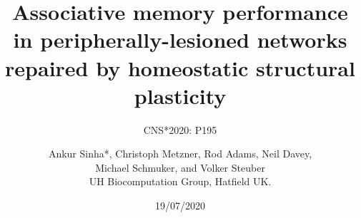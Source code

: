 
\usepackage{color}
\usepackage{tipa}
\usepackage[scale=2]{ccicons}
\usepackage{amssymb}
\usepackage{tikz}
\usetikzlibrary{mindmap, arrows.meta, positioning, arrows}
\usepackage{pgfplots}
\usepackage{jneurosci}
\usepackage{subcaption}
\usepackage[T1]{fontenc}
\usepackage[utf8]{inputenc}
\usepackage[style=nature,backend=biber,autocite=footnote]{biblatex}

\renewcommand*{\bibfont}{\tiny}
\usepackage[sfdefault]{roboto}
\usepackage[normalem]{ulem}
\usepackage{hyperref}
\hypersetup{colorlinks,linkcolor=Green,urlcolor=links}
\usepackage{graphicx}
\usepackage{algorithmic}
\usepackage{textcomp}
\usepackage{wrapfig}
\usepackage{textgreek}
\usepackage{euler}
\usepackage{csquotes}
\usepackage{tabularx}
\usepackage{booktabs}


\renewcommand{\footnoterule}{}

\title{Associative memory performance in peripherally-lesioned networks repaired by homeostatic structural plasticity}
\subtitle{CNS*2020: P195}
\author[Ankur Sinha]{Ankur Sinha*, Christoph Metzner, Rod Adams, Neil Davey, \\Michael Schmuker, and Volker Steuber\\UH Biocomputation Group, Hatfield UK.}
\date{19/07/2020}




